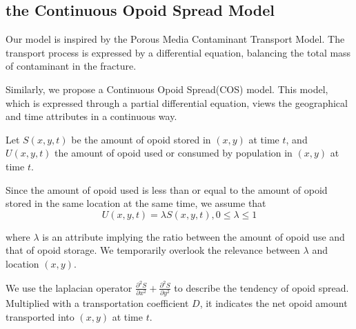\subsection{the Continuous Opoid Spread Model}
Our model is inspired by the Porous Media Contaminant Transport Model.\cite{8} The transport process is expressed by a differential equation, balancing the total mass of contaminant in the fracture. 

Similarly, we propose a Continuous Opoid Spread(COS) model. This model, which is expressed through a partial differential equation, views the geographical and time attributes in a continuous way. 

Let $S(x,y,t)$ be the amount of opoid stored in $(x,y)$ at time $t$, and $U(x,y,t)$ the amount of opoid used or consumed by population in $(x,y)$ at time $t$.
\begin{comment}
, and $F(x,y,t)$ as the amount of drugs identified in $(x,y)$ at time $t$. We assume that the amount of identified drugs is directly proportional to the total amount of drugs with a proportionality constant $k$, such that

The NFLIS data contains opoid identification counts in years 2010-2017 for narcotic analgesics and heroin in each of the counties from the five states stated in the problem background section. We denote this data as $F(x,y,t)$, the amount of drugs identified in $(x,y)$ at time $t$. 

\begin{equation}
S(x,y,t) = k F(x,y,t)
\end{equation}
\end{comment}
Since the amount of opoid used is less than or equal to the amount of opoid stored in the same location at the same time, we assume that
\begin{equation}
U(x,y,t) = \lambda S(x,y,t), 0\leq \lambda \leq 1
\end{equation}

where $\lambda$ is an attribute implying the ratio between the amount of opoid use and that of opoid storage. We temporarily overlook the relevance between $\lambda$ and location $(x,y)$.


We use the laplacian operator $\frac{\partial^2 S}{\partial x^2} + \frac{\partial^2 S}{\partial y^2}$ to describe the tendency of opoid spread. Multiplied with a transportation coefficient $D$, it indicates the net opoid amount transported into $(x,y)$ at time $t$.

